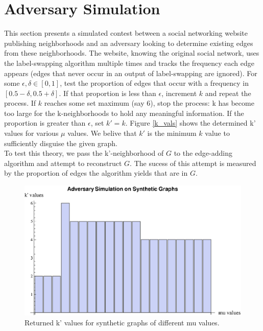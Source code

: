 \section{Adversary Simulation}

\noindent This section presents a simulated contest between a social networking website publishing neighborhoods and an adversary looking to determine existing edges from these neighborhoods. The website, knowing the original social network, uses the label-swapping algorithm multiple times and tracks the frequency each edge appears (edges that never occur in an output of label-swapping are ignored). For some $\epsilon,\delta \in [0,1]$, test the proportion of edges that occur with a frequency in $[0.5-\delta,0.5+\delta]$. If that proportion is less than $\epsilon$, increment $k$ and repeat the process. If $k$ reaches some set maximum (say 6), stop the process: k has become too large for the k-neighborhoods to hold any meaningful information. If the proportion is greater than $\epsilon$, set $k' = k$.  Figure \ref{k_vals} shows the determined k' values for various $\mu$ values. We belive that $k'$ is the minimum $k$ value to sufficiently disguise the given graph. \\

\indent To test this theory, we pass the k'-neighborhood of $G$ to the edge-adding algorithm and attempt to reconstruct $G$. The sucess of this attempt is measured by the proportion of edges the algorithm yields that are in $G$.\\

\begin{figure}[H]
  \label{k_vals}
\centerline{\includegraphics[scale=0.5]{k_values.eps}}
  \caption{Returned k' values for synthetic graphs of different mu values.}
  \label{fig:k'_values}
\end{figure}
